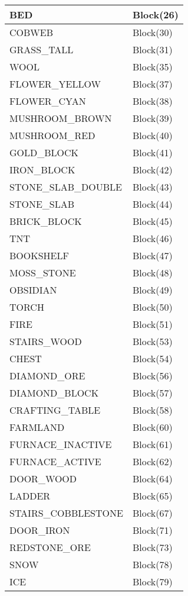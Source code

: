 \documentclass[letterpaper,10pt,english]{sphinxmanual}
\begin{document}
\begin{longtable}{|l|l|}
\\
\hline
BED
 & 
Block(26)
\\
\hline
COBWEB
 & 
Block(30)
\\
\hline
GRASS\_TALL
 & 
Block(31)
\\
\hline
WOOL
 & 
Block(35)
\\
\hline
FLOWER\_YELLOW
 & 
Block(37)
\\
\hline
FLOWER\_CYAN
 & 
Block(38)
\\
\hline
MUSHROOM\_BROWN
 & 
Block(39)
\\
\hline
MUSHROOM\_RED
 & 
Block(40)
\\
\hline
GOLD\_BLOCK
 & 
Block(41)
\\
\hline
IRON\_BLOCK
 & 
Block(42)
\\
\hline
STONE\_SLAB\_DOUBLE
 & 
Block(43)
\\
\hline
STONE\_SLAB
 & 
Block(44)
\\
\hline
BRICK\_BLOCK
 & 
Block(45)
\\
\hline
TNT
 & 
Block(46)
\\
\hline
BOOKSHELF
 & 
Block(47)
\\
\hline
MOSS\_STONE
 & 
Block(48)
\\
\hline
OBSIDIAN
 & 
Block(49)
\\
\hline
TORCH
 & 
Block(50)
\\
\hline
FIRE
 & 
Block(51)
\\
\hline
STAIRS\_WOOD
 & 
Block(53)
\\
\hline
CHEST
 & 
Block(54)
\\
\hline
DIAMOND\_ORE
 & 
Block(56)
\\
\hline
DIAMOND\_BLOCK
 & 
Block(57)
\\
\hline
CRAFTING\_TABLE
 & 
Block(58)
\\
\hline
FARMLAND
 & 
Block(60)
\\
\hline
FURNACE\_INACTIVE
 & 
Block(61)
\\
\hline
FURNACE\_ACTIVE
 & 
Block(62)
\\
\hline
DOOR\_WOOD
 & 
Block(64)
\\
\hline
LADDER
 & 
Block(65)
\\
\hline
STAIRS\_COBBLESTONE
 & 
Block(67)
\\
\hline
DOOR\_IRON
 & 
Block(71)
\\
\hline
REDSTONE\_ORE
 & 
Block(73)
\\
\hline
SNOW
 & 
Block(78)
\\
\hline
ICE
 & 
Block(79)
\\
\hline

\end{longtable}
\end{document}

